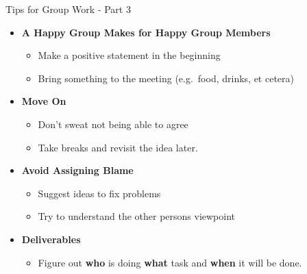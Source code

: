 \begin{frame}{Tips for Group Work - Part 3}

\begin{itemize}
\tightlist
\item
  \textbf{A Happy Group Makes for Happy Group Members}

  \begin{itemize}
  \tightlist
  \item
    Make a positive statement in the beginning
  \item
    Bring something to the meeting (e.g.~food, drinks, et cetera)
  \end{itemize}
\item
  \textbf{Move On}

  \begin{itemize}
  \tightlist
  \item
    Don't sweat not being able to agree
  \item
    Take breaks and revisit the idea later.
  \end{itemize}
\item
  \textbf{Avoid Assigning Blame}

  \begin{itemize}
  \tightlist
  \item
    Suggest ideas to fix problems
  \item
    Try to understand the other persons viewpoint
  \end{itemize}
\item
  \textbf{Deliverables}

  \begin{itemize}
  \tightlist
  \item
    Figure out \textbf{who} is doing \textbf{what} task and
    \textbf{when} it will be done.
  \end{itemize}
\end{itemize}

\end{frame}

